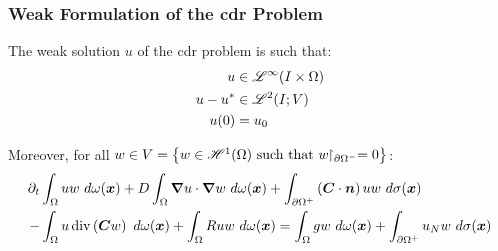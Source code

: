 \begin{frame}
    \frametitle{Weak Formulation of the \acrshort{cdr} Problem}

    \vspace*{\fill}
    \begin{center}
        \begin{minipage}{0.75\textwidth}
            \begin{definition}
                The weak solution $u$ of the \acrshort{cdr} problem is such that:
                \begin{align*}
                    u &\in \SpaceLp{\infty}(I \times \Omega) \\
                    u - u^* &\in \SpaceLp{2}(I; V) \\
                    u(0) &= u_0 %
                \end{align*}

                Moreover, for all $w \in V =  \left\{ w \in \mathscr{H}^{1}(\Omega) \text{ such that } w \!\!\restriction_{\partial \Omega^-} = 0 \right\}$:
                \begin{align*}
                    \partial_t & \int_{\Omega} u w ~ d \omega(\bm{x}) + D \int_{\Omega} \bm{\nabla} u \cdot \bm{\nabla} w ~ d \omega(\bm{x}) + \int_{\partial \Omega^+} \left( \bm{C} \cdot \bm{n} \right) u w ~ d \sigma(\bm{x}) \\ 
                    - & \int_{\Omega} u \operatorname*{div} \left( \bm{C} w \right) ~ d \omega(\bm{x}) + \int_{\Omega} R u w ~ d \omega(\bm{x}) = \int_{\Omega} g w ~ d \omega(\bm{x}) + \int_{\partial \Omega^+} u_N w ~ d \sigma(\bm{x})
                \end{align*}
            \end{definition}
        \end{minipage}
    \end{center}
    \vspace*{\fill}
    
\end{frame}

